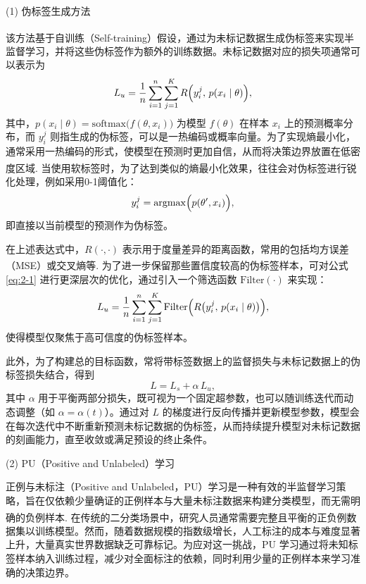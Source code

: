 (1) 伪标签生成方法

该方法基于自训练（Self-training）假设\textsuperscript{\cite{lee2013pseudo,zhu2005semi}}，通过为未标记数据生成伪标签来实现半监督学习，并将这些伪标签作为额外的训练数据。未标记数据对应的损失项通常可以表示为
\begin{equation}\label{eq:2-1}
	L_u = \frac{1}{n} \sum_{i=1}^{n} \sum_{j=1}^{K} R \Bigl( y_i^{j}, \, p(x_i \mid \theta) \Bigr),
\end{equation}
其中，$ p(x_i \mid \theta) = \mathrm{softmax}\bigl(f(\theta, x_i)\bigr) $ 为模型 $ f(\theta) $ 在样本 $ x_i $ 上的预测概率分布，而 $ y_i^{j} $ 则指生成的伪标签，可以是一热编码或概率向量。为了实现熵最小化，通常采用一热编码的形式，使模型在预测时更加自信，从而将决策边界放置在低密度区域\textsuperscript{\cite{chapelle2009semi}}. 当使用软标签时，为了达到类似的熵最小化效果，往往会对伪标签进行锐化处理，例如采用0-1阈值化：
\begin{equation}\label{eq:2-2}
	y_i^{j} = \mathrm{argmax}\Bigl(p(\theta', x_i)\Bigr),
\end{equation}
即直接以当前模型的预测作为伪标签。

在上述表达式中，$ R(\cdot, \cdot) $ 表示用于度量差异的距离函数，常用的包括均方误差（MSE）或交叉熵等\textsuperscript{\cite{van2020survey}}. 为了进一步保留那些置信度较高的伪标签样本，可对公式 \eqref{eq:2-1} 进行更深层次的优化，通过引入一个筛选函数 $\mathrm{Filter}(\cdot)$ 来实现：
\begin{equation}\label{eq:2-3}
	L_u = \frac{1}{n} \sum_{i=1}^{n} \sum_{j=1}^{K} 
	\mathrm{Filter} \Bigl( R \bigl( y_i^{j},\, p(x_i \mid \theta) \bigr) \Bigr),
\end{equation}
使得模型仅聚焦于高可信度的伪标签样本。

此外，为了构建总的目标函数，常将带标签数据上的监督损失与未标记数据上的伪标签损失结合，得到
\begin{equation}\label{eq:2-4}
	L = L_s + \alpha \, L_u,
\end{equation}
其中 $ \alpha $ 用于平衡两部分损失，既可视为一个固定超参数，也可以随训练迭代而动态调整（如 $\alpha = \alpha(t)$）。通过对 $ L $ 的梯度进行反向传播并更新模型参数，模型会在每次迭代中不断重新预测未标记数据的伪标签，从而持续提升模型对未标记数据的刻画能力，直至收敛或满足预设的终止条件。

(2) PU（Positive and Unlabeled）学习

正例与未标注（Positive and Unlabeled，PU）学习是一种有效的半监督学习策略，旨在仅依赖少量确证的正例样本与大量未标注数据来构建分类模型，而无需明确的负例样本\textsuperscript{\cite{elkan2008learning,mordelet2013bagging}}. 在传统的二分类场景中，研究人员通常需要完整且平衡的正负例数据集以训练模型。然而，随着数据规模的指数级增长，人工标注的成本与难度显著上升，大量真实世界数据缺乏可靠标记。为应对这一挑战，PU 学习通过将未知标签样本纳入训练过程，减少对全面标注的依赖，同时利用少量的正例样本来学习准确的决策边界。

